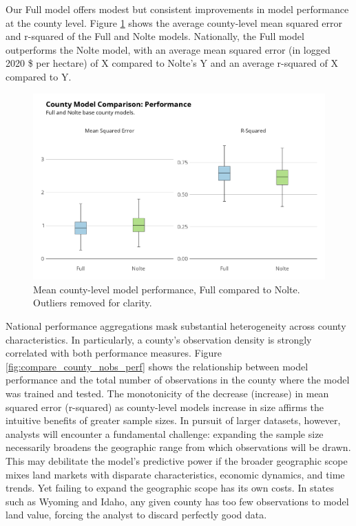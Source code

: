 \documentclass[12pt]{article}
\begin{document}
Our Full model offers modest but consistent improvements in model performance at the county level. Figure \ref{fig:county_compare_boxplot} shows the average county-level mean squared error and r-squared of the Full and Nolte models. Nationally, the Full model outperforms the Nolte model, with an average mean squared error (in logged 2020 \$ per hectare) of X compared to Nolte's Y and an average r-squared of X compared to Y.

\begin{figure}
    \centering
    \includegraphics[width=1\textwidth]{exhibits/county_compare_boxplot.png}
    \caption{Mean county-level model performance, Full compared to Nolte. Outliers removed for clarity.}
    \label{fig:county_compare_boxplot}
\end{figure}

National performance aggregations mask substantial heterogeneity across county characteristics. In particularly, a county's observation density is strongly correlated with both performance measures. Figure \ref{fig:compare_county_nobs_perf} shows the relationship between model performance and the total number of observations in the county where the model was trained and tested. The monotonicity of the decrease (increase) in mean squared error (r-squared) as county-level models increase in size affirms the intuitive benefits of greater sample sizes. In pursuit of larger datasets, however, analysts will encounter a fundamental challenge: expanding the sample size necessarily broadens the geographic range from which observations will be drawn. This may debilitate the model's predictive power if the broader geographic scope mixes land markets with disparate characteristics, economic dynamics, and time trends. Yet failing to expand the geographic scope has its own costs. In states such as Wyoming and Idaho, any given county has too few observations to model land value, forcing the analyst to discard perfectly good data.
\end{document}
